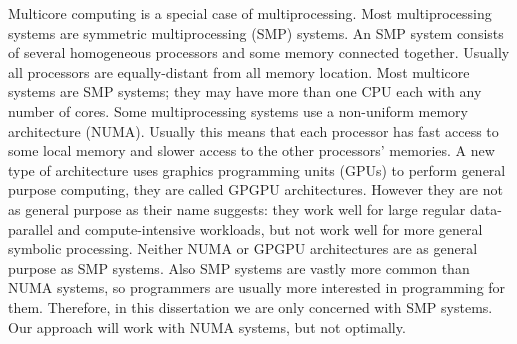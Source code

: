 
Multicore computing is a special case of multiprocessing.
Most multiprocessing systems are symmetric multiprocessing (SMP) systems.
An SMP system consists of several homogeneous processors and some memory
connected together.
Usually all processors are equally-distant from all memory location.
Most multicore systems are SMP systems;
they may have more than one CPU each with any number of cores.
Some multiprocessing systems use a non-uniform memory architecture (NUMA).
Usually this means that each processor has fast access to some local memory
and slower access to the other processors' memories.
A new type of architecture uses graphics programming units (GPUs) to
perform general purpose computing,
they are called GPGPU architectures.
However they are not as general purpose as their name suggests:
they work well for large regular data-parallel and compute-intensive
workloads, but not work well for more general symbolic processing.
Neither NUMA or GPGPU architectures are as general purpose as SMP systems.
Also SMP systems are vastly more common than NUMA systems,
so programmers are usually more interested in programming for them.
Therefore, in this dissertation we are only concerned with SMP systems.
Our approach will work with NUMA systems, but not optimally.


